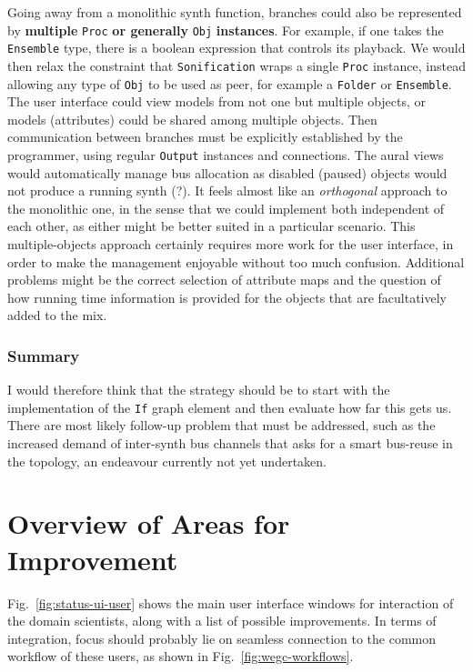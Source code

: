 \documentclass[11pt,a4paper]{article}
\newcommand{\figref}[1]{Fig.~\ref{#1}}
\begin{document}
Going away from a monolithic synth function, branches could also be represented by \textbf{multiple }\verb!Proc!\textbf{ or generally }\verb!Obj!\textbf{ instances}. For example, if one takes the \verb!Ensemble! type, there is a boolean expression that controls its playback. We would then relax the constraint that \verb!Sonification! wraps a single \verb!Proc! instance, instead allowing any type of \verb!Obj! to be used as peer, for example a \verb!Folder! or \verb!Ensemble!. The user interface could view models from not one but multiple objects, or models (attributes) could be shared among multiple objects. Then communication between branches must be explicitly established by the programmer, using regular \verb!Output! instances and connections. The aural views would automatically manage bus allocation as disabled (paused) objects would not produce a running synth (?). It feels almost like an \emph{orthogonal} approach to the monolithic one, in the sense that we could implement both independent of each other, as either might be better suited in a particular scenario. This multiple-objects approach certainly requires more work for the user interface, in order to make the management enjoyable without too much confusion. Additional problems might be the correct selection of attribute maps and the question of how running time information is provided for the objects that are facultatively added to the mix.

\subsubsection*{Summary}

I would therefore think that the strategy should be to start with the implementation of the \verb!If! graph element and then evaluate how far this gets us. There are most likely follow-up problem that must be addressed, such as the increased demand of inter-synth bus channels that asks for a smart bus-reuse in the topology, an endeavour currently not yet undertaken.

\section{Overview of Areas for Improvement}

\figref{fig:status-ui-user} shows the main user interface windows for interaction of the domain scientists, along with a list of possible improvements. In terms of integration, focus should probably lie on seamless connection to the common workflow of these users, as shown in \figref{fig:wegc-workflows}.
\end{document}
